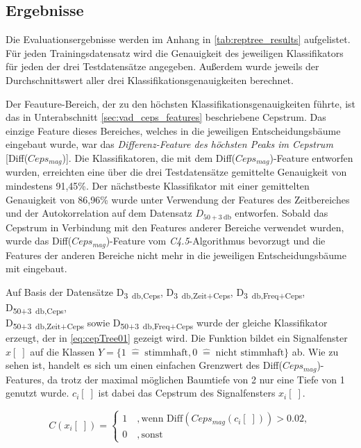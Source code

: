 \subsection{Ergebnisse}
\label{sec:vad_results}

Die Evaluationsergebnisse werden im Anhang in \autoref{tab:reptree_results} aufgelistet. Für jeden Trainingsdatensatz wird die Genauigkeit des jeweiligen Klassifikators für jeden der drei Testdatensätze angegeben. Außerdem wurde jeweils der Durchschnittswert aller drei Klassifikationsgenauigkeiten berechnet.

Der Feauture-Bereich, der zu den höchsten Klassifikationsgenauigkeiten führte, ist das in Unterabschnitt \ref{sec:vad_ceps_features} beschriebene Cepstrum. Das einzige Feature dieses Bereiches, welches in die jeweiligen Entscheidungsbäume eingebaut wurde, war das \emph{Differenz-Feature des höchsten Peaks im Cepstrum} [Diff($Ceps_{mag}$)]. Die Klassifikatoren, die mit dem Diff($Ceps_{mag}$)-Feature entworfen wurden, erreichten eine über die drei Testdatensätze gemittelte Genauigkeit von mindestens 91,45\%. Der nächstbeste Klassifikator mit einer gemittelten Genauigkeit von 86,96\% wurde unter Verwendung der Features des Zeitbereiches und der Autokorrelation auf dem Datensatz $D_{50+\SI{3}{\decibel}}$ entworfen. Sobald das Cepstrum in Verbindung mit den Features anderer Bereiche verwendet wurden, wurde das Diff($Ceps_{mag}$)-Feature vom \emph{C4.5}-Algorithmus bevorzugt und die Features der anderen Bereiche nicht mehr in die jeweiligen Entscheidungsbäume mit eingebaut.

Auf Basis der Datensätze D\textsubscript{\SI{3}{\decibel},Ceps}, D\textsubscript{\SI{3}{\decibel},Zeit+Ceps}, D\textsubscript{\SI{3}{\decibel},Freq+Ceps}, D\textsubscript{50+\SI{3}{\decibel},Ceps}, \\ D\textsubscript{50+\SI{3}{\decibel},Zeit+Ceps} sowie D\textsubscript{50+\SI{3}{\decibel},Freq+Ceps} wurde der gleiche Klassifikator erzeugt, der in \autoref{eq:cepTree01} gezeigt wird. Die Funktion bildet ein Signalfenster $x[\;]$ auf die Klassen $Y = \{ 1 \; \hat{=} \; \text{stimmhaft}, 0 \; \hat{=} \; \text{nicht stimmhaft}\}$ ab. Wie zu sehen ist, handelt es sich um einen einfachen Grenzwert des Diff($Ceps_{mag}$)-Features, da trotz der maximal möglichen Baumtiefe von 2 nur eine Tiefe von 1 genutzt wurde. $c_i[\;]$ ist dabei das Cepstrum des Signalfensters $x_i[\;]$.

\begin{equation}
C(x_i[\;]) = \begin{cases}
1 \quad , \text{wenn  Diff}(Ceps_{mag}(c_i[\;])) > 0.02, \\
0 \quad , \text{sonst}
\end{cases}
\label{eq:cepTree01}
\end{equation}


